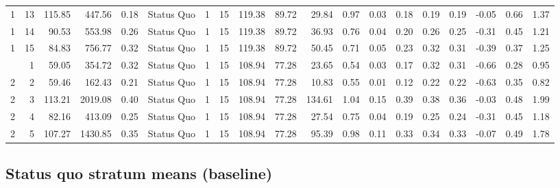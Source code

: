\documentclass[
]{article}
\begin{document}
\begin{table}[!h]
{\begin{tabular}[t]{rrrrrlrrrrrrrrrrrrr}
1 & 13 & 115.85 & 447.56 & 0.18 & Status Quo & 1 & 15 & 119.38 & 89.72 & 29.84 & 0.97 & 0.03 & 0.18 & 0.19 & 0.19 & -0.05 & 0.66 & 1.37\\
1 & 14 & 90.53 & 553.98 & 0.26 & Status Quo & 1 & 15 & 119.38 & 89.72 & 36.93 & 0.76 & 0.04 & 0.20 & 0.26 & 0.25 & -0.31 & 0.45 & 1.21\\
1 & 15 & 84.83 & 756.77 & 0.32 & Status Quo & 1 & 15 & 119.38 & 89.72 & 50.45 & 0.71 & 0.05 & 0.23 & 0.32 & 0.31 & -0.39 & 0.37 & 1.25\\
\addlinespace
2 & 1 & 59.05 & 354.72 & 0.32 & Status Quo & 1 & 15 & 108.94 & 77.28 & 23.65 & 0.54 & 0.03 & 0.17 & 0.32 & 0.31 & -0.66 & 0.28 & 0.95\\
2 & 2 & 59.46 & 162.43 & 0.21 & Status Quo & 1 & 15 & 108.94 & 77.28 & 10.83 & 0.55 & 0.01 & 0.12 & 0.22 & 0.22 & -0.63 & 0.35 & 0.82\\
2 & 3 & 113.21 & 2019.08 & 0.40 & Status Quo & 1 & 15 & 108.94 & 77.28 & 134.61 & 1.04 & 0.15 & 0.39 & 0.38 & 0.36 & -0.03 & 0.48 & 1.99\\
2 & 4 & 82.16 & 413.09 & 0.25 & Status Quo & 1 & 15 & 108.94 & 77.28 & 27.54 & 0.75 & 0.04 & 0.19 & 0.25 & 0.24 & -0.31 & 0.45 & 1.18\\
2 & 5 & 107.27 & 1430.85 & 0.35 & Status Quo & 1 & 15 & 108.94 & 77.28 & 95.39 & 0.98 & 0.11 & 0.33 & 0.34 & 0.33 & -0.07 & 0.49 & 1.78\\
\bottomrule
\end{tabular}}
\end{table}

\subsection{Status quo stratum means
(baseline)}\label{status-quo-stratum-means-baseline}
\end{document}
